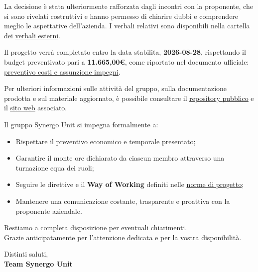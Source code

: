 \documentclass[11pt, a4paper]{article}
\begin{document}
	\vspace{0.3cm}
	La decisione è stata ulteriormente rafforzata dagli incontri con la proponente, che si sono rivelati costruttivi e hanno permesso
	di chiarire dubbi e comprendere meglio le aspettative dell’azienda.
	I verbali relativi sono disponibili nella cartella dei \href{https://github.com/Synergo-Unit-UniPD/Second-Brain/tree/main/docs/CC/doc_gestionali/verb_esterni}{\uline{verbali esterni}}.

	\vspace{0.3cm}
	Il progetto verrà completato entro la data stabilita, \textbf{2026-08-28}, rispettando il budget preventivato pari a \textbf{11.665,00\euro},
	come riportato nel documento ufficiale: \href{https://synergo-unit-unipd.github.io/Second-Brain/docs/CC/doc_gestionali/doc_esterni/preventivo_costi_assunzione_impegni/preventivo_costi_e_assunzione_impegni.pdf}{\uline{preventivo costi e assunzione impegni}}.

	Per ulteriori informazioni sulle attività del gruppo, sulla documentazione prodotta e sul materiale aggiornato,
	è possibile consultare il \href{https://github.com/Synergo-Unit-UniPD/Second-Brain}{\uline{repository pubblico}}
	e il \href{https://synergo-unit-unipd.github.io/Second-Brain/}{\uline{sito web}} associato.

	
	\vspace{0.5cm}
	Il gruppo Synergo Unit si impegna formalmente a:
	\begin{itemize}
		\item Rispettare il preventivo economico e temporale presentato;
		\item Garantire il monte ore dichiarato da ciascun membro attraverso una turnazione equa dei ruoli;
		\item Seguire le direttive e il \textbf{Way of Working} definiti nelle \href{https://synergo-unit-unipd.github.io/Second-Brain/docs/CC/doc_gestionali/doc_interni/norme_di_progetto/norme_di_progetto.pdf}{\uline{norme di progetto}};
		\item Mantenere una comunicazione costante, trasparente e proattiva con la proponente aziendale.
	\end{itemize}
	
	\vspace{0.5cm}
	Restiamo a completa disposizione per eventuali chiarimenti. \\
	Grazie anticipatamente per l'attenzione dedicata e per la vostra disponibilità.
	
	\vspace{0.5cm}
	Distinti saluti,\\
	\textbf{Team Synergo Unit} 

	
	
\end{document}
